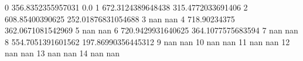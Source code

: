0 356.8352355957031 0.0
1 672.3124389648438 315.4772033691406
2 608.85400390625 252.01876831054688
3 nan nan
4 718.90234375 362.0671081542969
5 nan nan
6 720.9429931640625 364.1077575683594
7 nan nan
8 554.7051391601562 197.86990356445312
9 nan nan
10 nan nan
11 nan nan
12 nan nan
13 nan nan
14 nan nan
